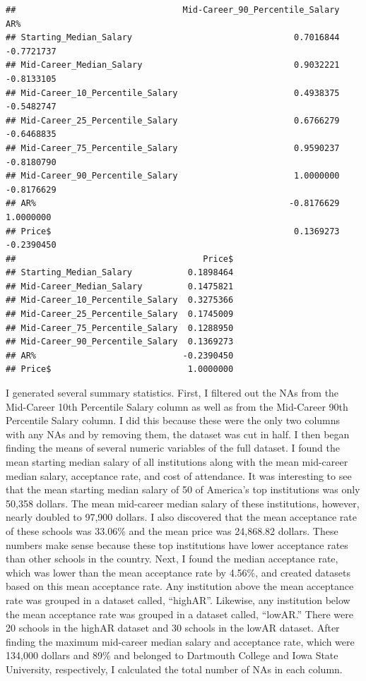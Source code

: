 \documentclass[]{article}
\begin{document}
\begin{verbatim}
##                                 Mid-Career_90_Percentile_Salary        AR%
## Starting_Median_Salary                                0.7016844 -0.7721737
## Mid-Career_Median_Salary                              0.9032221 -0.8133105
## Mid-Career_10_Percentile_Salary                       0.4938375 -0.5482747
## Mid-Career_25_Percentile_Salary                       0.6766279 -0.6468835
## Mid-Career_75_Percentile_Salary                       0.9590237 -0.8180790
## Mid-Career_90_Percentile_Salary                       1.0000000 -0.8176629
## AR%                                                  -0.8176629  1.0000000
## Price$                                                0.1369273 -0.2390450
##                                     Price$
## Starting_Median_Salary           0.1898464
## Mid-Career_Median_Salary         0.1475821
## Mid-Career_10_Percentile_Salary  0.3275366
## Mid-Career_25_Percentile_Salary  0.1745009
## Mid-Career_75_Percentile_Salary  0.1288950
## Mid-Career_90_Percentile_Salary  0.1369273
## AR%                             -0.2390450
## Price$                           1.0000000
\end{verbatim}

I generated several summary statistics. First, I filtered out the NAs
from the Mid-Career 10th Percentile Salary column as well as from the
Mid-Career 90th Percentile Salary column. I did this because these were
the only two columns with any NAs and by removing them, the dataset was
cut in half. I then began finding the means of several numeric variables
of the full dataset. I found the mean starting median salary of all
institutions along with the mean mid-career median salary, acceptance
rate, and cost of attendance. It was interesting to see that the mean
starting median salary of 50 of America's top institutions was only
50,358 dollars. The mean mid-career median salary of these institutions,
however, nearly doubled to 97,900 dollars. I also discovered that the
mean acceptance rate of these schools was 33.06\% and the mean price was
24,868.82 dollars. These numbers make sense because these top
institutions have lower acceptance rates than other schools in the
country. Next, I found the median acceptance rate, which was lower than
the mean acceptance rate by 4.56\%, and created datasets based on this
mean acceptance rate. Any institution above the mean acceptance rate was
grouped in a dataset called, ``highAR''. Likewise, any institution below
the mean acceptance rate was grouped in a dataset called, ``lowAR.''
There were 20 schools in the highAR dataset and 30 schools in the lowAR
dataset. After finding the maximum mid-career median salary and
acceptance rate, which were 134,000 dollars and 89\% and belonged to
Dartmouth College and Iowa State University, respectively, I calculated
the total number of NAs in each column.
\end{document}
